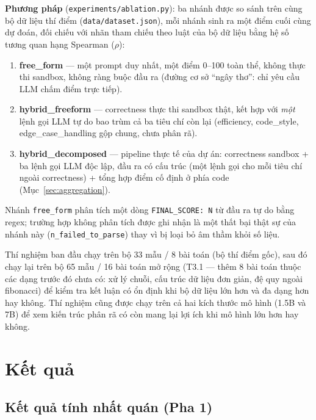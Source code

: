 \documentclass[a4paper,12pt]{report}
\begin{document}
\textbf{Phương pháp} (\texttt{experiments/ablation.py}): ba nhánh được so
sánh trên cùng bộ dữ liệu thí điểm (\texttt{data/dataset.json}), mỗi nhánh
sinh ra một điểm cuối cùng dự đoán, đối chiếu với nhãn tham chiếu theo luật
của bộ dữ liệu bằng hệ số tương quan hạng Spearman ($\rho$):
\begin{enumerate}
  \item \textbf{free\_form} — một prompt duy nhất, một điểm 0--100 toàn
    thể, không thực thi sandbox, không ràng buộc đầu ra (đường cơ sở
    ``ngây thơ'': chỉ yêu cầu LLM chấm điểm trực tiếp).
  \item \textbf{hybrid\_freeform} — correctness thực thi sandbox thật, kết
    hợp với \emph{một} lệnh gọi LLM tự do bao trùm cả ba tiêu chí còn lại
    (efficiency, code\_style, edge\_case\_handling gộp chung, chưa phân
    rã).
  \item \textbf{hybrid\_decomposed} — pipeline thực tế của dự án:
    correctness sandbox + ba lệnh gọi LLM độc lập, đầu ra có cấu trúc (một
    lệnh gọi cho mỗi tiêu chí ngoài correctness) + tổng hợp điểm cố định ở
    phía code (Mục~\ref{sec:aggregation}).
\end{enumerate}

Nhánh \texttt{free\_form} phân tích một dòng \texttt{FINAL\_SCORE: N} từ
đầu ra tự do bằng regex; trường hợp không phân tích được ghi nhận là một
thất bại thật sự của nhánh này (\texttt{n\_failed\_to\_parse}) thay vì bị
loại bỏ âm thầm khỏi số liệu.

Thí nghiệm ban đầu chạy trên bộ 33 mẫu / 8 bài toán (bộ thí điểm gốc), sau
đó chạy lại trên bộ 65 mẫu / 16 bài toán mở rộng (T3.1 — thêm 8 bài toán
thuộc các dạng trước đó chưa có: xử lý chuỗi, cấu trúc dữ liệu đơn giản, đệ
quy ngoài fibonacci) để kiểm tra kết luận có ổn định khi bộ dữ liệu lớn hơn
và đa dạng hơn hay không. Thí nghiệm cũng được chạy trên cả hai kích thước
mô hình (1.5B và 7B) để xem kiến trúc phân rã có còn mang lại lợi ích khi
mô hình lớn hơn hay không.

\chapter{Kết quả}
\label{ch:results}

\section{Kết quả tính nhất quán (Pha 1)}
\label{sec:results-consistency}
\end{document}
